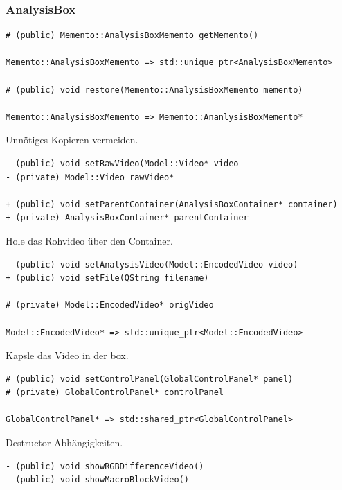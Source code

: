 \documentclass{scrartcl}
\begin{document}
{\subsubsection{AnalysisBox}
\bigskip
\begin{verbatim}
# (public) Memento::AnalysisBoxMemento getMemento()

Memento::AnalysisBoxMemento => std::unique_ptr<AnalysisBoxMemento>

# (public) void restore(Memento::AnalysisBoxMemento memento)

Memento::AnalysisBoxMemento => Memento::AnanlysisBoxMemento*
\end{verbatim}
Unnötiges Kopieren vermeiden.
\bigskip
\begin{verbatim}
- (public) void setRawVideo(Model::Video* video
- (private) Model::Video rawVideo*

+ (public) void setParentContainer(AnalysisBoxContainer* container)
+ (private) AnalysisBoxContainer* parentContainer
\end{verbatim}
Hole das Rohvideo über den Container.
\bigskip
\begin{verbatim}
- (public) void setAnalysisVideo(Model::EncodedVideo video)
+ (public) void setFile(QString filename)

# (private) Model::EncodedVideo* origVideo

Model::EncodedVideo* => std::unique_ptr<Model::EncodedVideo>
\end{verbatim}
Kapsle das Video in der box.
\bigskip
\begin{verbatim}
# (public) void setControlPanel(GlobalControlPanel* panel)
# (private) GlobalControlPanel* controlPanel

GlobalControlPanel* => std::shared_ptr<GlobalControlPanel>
\end{verbatim}
Destructor Abhängigkeiten.
\bigskip
\begin{verbatim}
- (public) void showRGBDifferenceVideo()
- (public) void showMacroBlockVideo()


\end{verbatim}}
\end{document}

